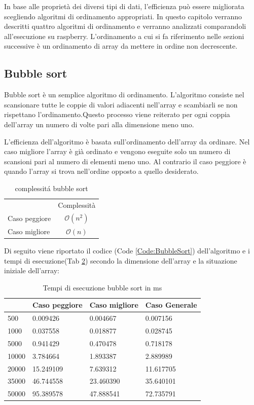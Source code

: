 \documentclass[12pt, a4paper]{report}
\begin{document}
In base alle proprietà dei diversi tipi di dati, l'efficienza può essere migliorata scegliendo algoritmi di ordinamento appropriati. In questo capitolo verranno descritti quattro algoritmi di ordinamento e verranno analizzati comparandoli all'esecuzione su raspberry. L'ordinamento a cui si fa riferimento nelle sezioni successive è un ordinamento di array da mettere in ordine non decrescente.

\subsection{Bubble sort}
Bubble sort è un semplice algoritmo di ordinamento. L'algoritmo consiste nel scansionare tutte le coppie di valori adiacenti nell'array e scambiarli se non rispettano l'ordinamento.Questo processo viene reiterato per ogni coppia dell'array un numero di volte pari alla dimensione meno uno.

L'efficienza dell'algoritmo è basata sull'ordinamento dell'array da ordinare. Nel caso migliore l'array è già ordinato e vengono eseguite solo un numero di scansioni pari al numero di elementi meno uno. Al contrario il caso peggiore è quando l'array si trova nell'ordine opposto a quello desiderato.

\begin{table}[ht]
	\centering
	\begin{tabular}{lc}
 & Complessità \\
Caso peggiore & $ \mathcal{O}(n^2)$ \\
Caso migliore & $ \mathcal{O}(n)$ \\
\end{tabular}
	\caption{complessit\'a bubble sort}
	\label{Tab:CompBubbleSort}
\end{table}

Di seguito viene riportato il codice (Code \ref{Code:BubbleSort}) dell'algoritmo e i tempi di esecuzione(Tab \ref{Tab:Tempi esecuzione Bubblesort}) secondo la dimensione dell'array e la situazione iniziale dell'array:
	

\begin{table}[ht]
\centering
\begin{tabular}{| l | l | l | l |}
\hline
 & Caso peggiore & Caso migliore & Caso Generale \\ \hline
500 & 0.009426 & 0.004667 & 0.007156 \\ \hline
1000 & 0.037558 & 0.018877 & 0.028745 \\ \hline
5000 & 0.941429 & 0.470478 & 0.718178 \\ \hline
10000 & 3.784664 & 1.893387 & 2.889989 \\ \hline
20000 & 15.249109 & 7.639312 & 11.617705 \\ \hline
35000 & 46.744558 & 23.460390 & 35.640101 \\ \hline
50000 & 95.389578 & 47.888541 & 72.735791 \\ \hline
\end{tabular}
\caption{Tempi di esecuzione bubble sort in ms}
\label{Tab:Tempi esecuzione Bubblesort}
\end{table}
\end{document}
